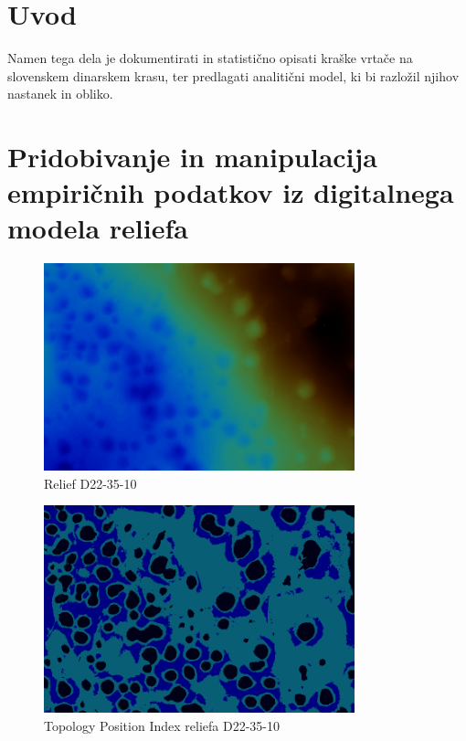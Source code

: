 \documentclass[a4paper, 12pt]{book}
\begin{document}
\mainmatter
\setcounter{page}{1}
\pagestyle{fancy}

\chapter{Uvod}

Namen tega dela je dokumentirati in statistično opisati kraške vrtače na slovenskem dinarskem krasu, ter predlagati analitični model, ki bi razložil njihov nastanek in obliko.


\chapter{Pridobivanje in manipulacija empiričnih podatkov iz digitalnega modela reliefa}

\begin{figure}
\begin{center}
\includegraphics[width=9cm]{slike/D22-35-10}
\end{center}
\caption{Relief D22-35-10}
\label{pic1}
\end{figure}

\begin{figure}
\begin{center}
\includegraphics[width=9cm]{slike/D22-35-10-TPI}
\end{center}
\caption{Topology Position Index reliefa D22-35-10}
\label{pic2}
\end{figure}
\end{document}
